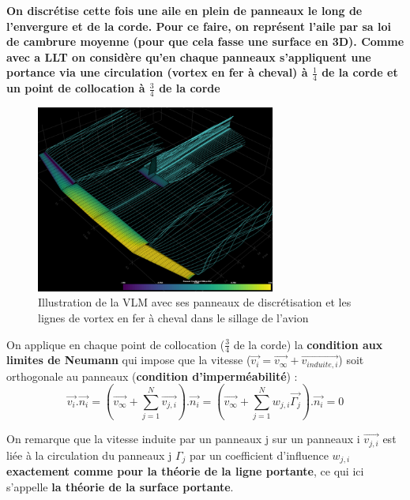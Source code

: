 \textbf{On discrétise cette fois une aile en plein de panneaux le long de l'envergure et de la corde. Pour ce faire, on représent l'aile par sa loi de cambrure moyenne (pour que cela fasse une surface en 3D). Comme avec a LLT on considère qu'en chaque panneaux s'appliquent une portance via une circulation (vortex en fer à cheval) à $\frac{1}{4}$ de la corde et un point de collocation à $\frac{3}{4}$ de la corde}

\begin{figure}[H]
    \centering
    \includegraphics[width=0.7\textwidth]{Pics/01 - Basses Fidélités/vlm.png}
    \caption{Illustration de la VLM avec ses panneaux de discrétisation et les lignes de vortex en fer à cheval dans le sillage de l'avion}
    \label{fig:vlm}
\end{figure}

On applique en chaque point de collocation ($\frac{3}{4}$ de la corde) la \textbf{condition aux limites de Neumann} qui impose que la vitesse ($\overrightarrow{v_i} = \overrightarrow{v_{\infty}} + \overrightarrow{v_{induite,i}}$) soit orthogonale au panneaux (\textbf{condition d'imperméabilité}) :
\begin{equation}
    \overrightarrow{v_i}.\overrightarrow{n_i} = (\overrightarrow{v_{\infty}} + \sum_{j =1}^{N}\overrightarrow{v_{j,i}}).\overrightarrow{n_i} = (\overrightarrow{v_{\infty}} + \sum_{j =1}^{N}w_{j,i}\overrightarrow{\Gamma_j}).\overrightarrow{n_i} = 0
    \label{eq: Neumann boundary}
\end{equation}

On remarque que la vitesse induite par un panneaux j sur un panneaux i $\overrightarrow{v_{j,i}}$ est liée à la circulation du panneaux j $\Gamma_j$ par un coefficient d'influence $w_{j,i}$ \textbf{exactement comme pour la théorie de la ligne portante}, ce qui ici s'appelle \textbf{la théorie de la surface portante}.

